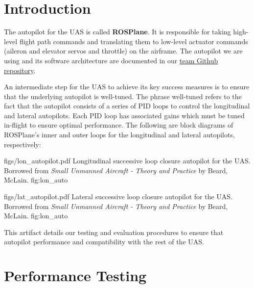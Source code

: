 \documentclass[]{auvsi_doc}
\begin{document}
\begin{AUVSITitlePage}
\begin{artifacttable}
\end{artifacttable}
\end{AUVSITitlePage}


\section{Introduction}

The autopilot for the UAS is called \textbf{ROSPlane}. It is responsible for taking high-level flight path commands and translating them to low-level actuator commands (aileron and elevator servos and throttle) on the airframe. The autopilot we are using and its software architecture are documented in our \href{https://github.com/BYU-AUVSI/rosplane}{team Github repository}.

An intermediate step for the UAS to achieve its key success measures is to ensure that the underlying autopilot is well-tuned. The phrase well-tuned refers to the fact that the autopilot consists of a series of PID loops to control the longitudinal and lateral autopilots. Each PID loop has associated gains which must be tuned in-flight to ensure optimal performance. The following are block diagrams of ROSPlane's inner and outer loops for the longitudinal and lateral autopilots, respectively:

\AUVSIFigure
{figs/lon_autopilot.pdf}
{\textwidth}
{Longitudinal successive loop closure autopilot for the UAS. Borrowed from \textit{Small Unmanned Aircraft - Theory and Practice} by Beard, McLain.}
{fig:lon_auto}

\AUVSIFigure
{figs/lat_autopilot.pdf}
{\textwidth}
{Lateral successive loop closure autopilot for the UAS. Borrowed from \textit{Small Unmanned Aircraft - Theory and Practice} by Beard, McLain.}
{fig:lon_auto}

This artifact details our testing and evaluation procedures to ensure that autopilot performance and compatibility with the rest of the UAS.

\section{Performance Testing}
\end{document}
